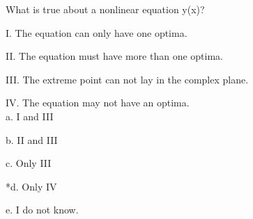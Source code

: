 
What is true about a nonlinear equation y(x)?

	I. The equation can only have one optima. 

	II. The equation must have more than one optima. 

	III. The extreme point can not lay in the complex plane.

	IV. The equation may not have an optima. \\

a. I and III

b. II and III

c.  Only III

*d. Only IV

e. I do not know. \\
